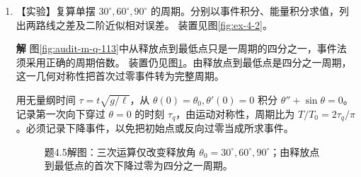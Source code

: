 \documentclass[11pt,openany,fontset=fandol]{ctexbook}
\theoremstyle{plain}\newtheorem{theorem}{定理}[chapter]\newtheorem{proposition}[theorem]{命题}
\theoremstyle{definition}\newtheorem{definition}{定义}[chapter]\newtheorem{example}{例}[chapter]
\theoremstyle{remark}\newtheorem*{remark}{说明}
\newcommand{\SolutionStart}{\par\nobreak\medskip\nobreak\noindent\textbf{解}\quad\ignorespaces}
\newenvironment{solution}{\SolutionStart}{\par\medskip}
\newcommand{\vct}[1]{\bm{#1}}\newcommand{\Rea}{\operatorname{Re}}\newcommand{\Ima}{\operatorname{Im}}
\begin{document}
\begin{enumerate}[label=4.\arabic*,itemsep=3pt]
\begin{solution}
有量纲射程为 $R=(v_0^2/g)\mathcal R(\alpha,\beta)$。同角度加倍初速后，射程比为
\[
\frac{R(2v_0)}{R(v_0)}
=4\frac{\mathcal R(\alpha,4\beta)}{\mathcal R(\alpha,\beta)}.
\]
长度尺度增加四倍，同时相对阻力增强，无量纲轨迹也改变，所以不能只保留前面的因子4。

阻力箭头的大小随速率平方改变。加倍初速会改变整条轨迹上的相对阻力，因而无量纲射程也会变化。
\end{solution}

\item \begin{minipage}[t]{\linewidth}
【实验】复算单摆 $30^\circ,60^\circ,90^\circ$ 的周期。分别以事件积分、能量积分求值，列出两路线之差及二阶近似相对误差。 装置见图\ref{fig:ex-4-2}。
\end{minipage}

\begin{solution}
图\ref{fig:audit-m-q-113}中从释放点到最低点只是一周期的四分之一，事件法须采用正确的周期倍数。
装置仍见图\ref{fig:hw-4-5}。由释放点到最低点是四分之一周期，这一几何对称性把首次过零事件转为完整周期。

用无量纲时间 $\tau=t\sqrt{g/\ell}$，从 $\theta(0)=\theta_0,\theta'(0)=0$ 积分 $\theta''+\sin\theta=0$。记录第一次向下穿过 $\theta=0$ 的时刻 $\tau_q$，由运动对称性，周期比为 $T/T_0=2\tau_q/\pi$。必须记录下降事件，以免把初始点或反向过零当成所求事件。

\begin{figure}[H]\centering
{}
\caption{题4.5解图：三次运算仅改变释放角 $\theta_0=30^\circ,60^\circ,90^\circ$；由释放点到最低点的首次下降过零为四分之一周期。}\label{fig:hw-4-5}
\end{figure}


\end{solution}
\end{enumerate}
\end{document}
